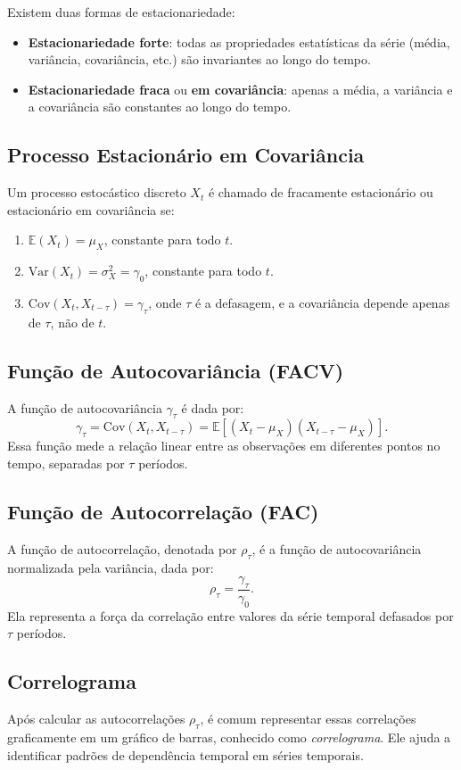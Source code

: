 \documentclass{sciposter}
\begin{document}
\begin{multicols}{3}
Existem duas formas de estacionariedade:
\begin{itemize}
    \item \textbf{Estacionariedade forte}: todas as propriedades estatísticas da série (média, variância, covariância, etc.) são invariantes ao longo do tempo.
    \item \textbf{Estacionariedade fraca} ou \textbf{em covariância}: apenas a média, a variância e a covariância são constantes ao longo do tempo.
\end{itemize}

\subsection{Processo Estacionário em Covariância}
Um processo estocástico discreto $X_t$ é chamado de fracamente estacionário ou estacionário em covariância se:
\begin{enumerate}
    \item $\mathbb{E}(X_t) = \mu_X$, constante para todo $t$.
    \item $\text{Var}(X_t) = \sigma_X^2 = \gamma_0$, constante para todo $t$.
    \item $\text{Cov}(X_t, X_{t-\tau}) = \gamma_\tau$, onde $\tau$ é a defasagem, e a covariância depende apenas de $\tau$, não de $t$.
\end{enumerate}

\subsection{Função de Autocovariância (FACV)}
A função de autocovariância $\gamma_\tau$ é dada por:
\[
\gamma_\tau = \text{Cov}(X_t, X_{t-\tau}) = \mathbb{E}\left[(X_t - \mu_X)(X_{t-\tau} - \mu_X)\right].
\]
Essa função mede a relação linear entre as observações em diferentes pontos no tempo, separadas por $\tau$ períodos.

\subsection{Função de Autocorrelação (FAC)}
A função de autocorrelação, denotada por $\rho_\tau$, é a função de autocovariância normalizada pela variância, dada por:
\[
\rho_\tau = \frac{\gamma_\tau}{\gamma_0}.
\]
Ela representa a força da correlação entre valores da série temporal defasados por $\tau$ períodos.

\subsection{Correlograma}
Após calcular as autocorrelações $\rho_\tau$, é comum representar essas correlações graficamente em um gráfico de barras, conhecido como \textit{correlograma}. Ele ajuda a identificar padrões de dependência temporal em séries temporais.


\end{multicols}
\end{document}
